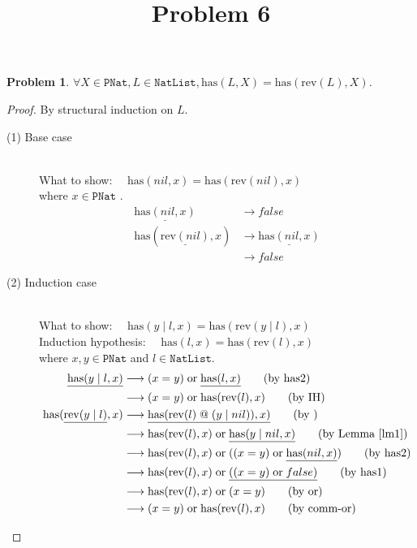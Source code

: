 \documentclass[12pt, a4paper]{article}
\title{Problem 6}
\date{\vspace{-5ex}}
\newtheorem{problem}{Problem}
\newcommand{\rel}[1]{\mathrel{#1}}
\newcommand{\rmx}[1]{\mathrm{#1}}
\newcommand{\larrow}{\longrightarrow}
\newcommand{\under}{\underline}
\begin{document}
\maketitle

\begin{problem}
$\forall X \in \mathtt{PNat}, L \in \mathtt{NatList}, \rmx{has}(L, X) = \rmx{has}(\rmx{rev}(L), X)$.
\end{problem}
\begin{proof}
By structural induction on $L$.

\begin{description}
\item[(1) Base case]~\\
\noindent
What to show: $\quad \rmx{has}(nil, x) = \rmx{has}(\rmx{rev}(nil), x)$ \\
where $x \in \mathtt{PNat}$ .
\begin{align*}
\under{\rmx{has}(nil, x)}
	&\larrow false \tag{by has1} \\
\rmx{has}(\under{\rmx{rev}(nil)}, x)
	&\larrow \under{\rmx{has}(nil, x)} \tag{by rev1} \\
	&\larrow false \tag{by has1}
\end{align*}

\item[(2) Induction case]~\\
What to show: $\quad \rmx{has}(y \rel{|} l, x) = \rmx{has}(\rmx{rev}(y \rel{|} l), x)$ \\
Induction hypothesis: $\quad \rmx{has}(l, x) = \rmx{has}(\rmx{rev}(l), x)$  \\
where $x, y \in \mathtt{PNat}$ and $l \in \mathtt{NatList}$.
\begin{align*}
\under{\rmx{has}(y \rel{|} l, x)}
	&\larrow (x = y) \rel{\rmx{or}} \under{\rmx{has}(l, x)}  \tag{by has2} \\
	&\larrow (x = y) \rel{\rmx{or}} \rmx{has}(\rmx{rev}(l), x)  \tag{by IH} \\
\rmx{has}(\under{\rmx{rev}(y \rel{|} l)}, x)
	&\larrow \under{\rmx{has}(\rmx{rev}(l) \rel{@} (y \rel{|} nil)), x)} \tag{by } \\
	&\larrow \rmx{has}(\rmx{rev}(l), x) \rel{\rmx{or}} \under{\rmx{has}(y \rel{|} nil, x)} \tag{by Lemma~\ref{lm1}} \\
	&\larrow \rmx{has}(\rmx{rev}(l), x) \rel{\rmx{or}} ((x = y) \rel{\rmx{or}} \under{\rmx{has}(nil, x)}) \tag{by has2} \\
	&\larrow \rmx{has}(\rmx{rev}(l), x) \rel{\rmx{or}} \under{((x = y) \rel{\rmx{or}} false)} \tag{by has1} \\
	&\larrow \rmx{has}(\rmx{rev}(l), x) \rel{\rmx{or}} (x = y) \tag{by or} \\
	&\larrow (x = y) \rel{\rmx{or}} \rmx{has}(\rmx{rev}(l), x) \tag{by comm-or}
\end{align*}

\end{description}

\end{proof}
\end{document}
